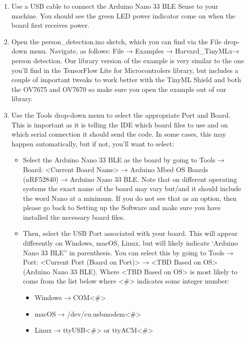 \begin{enumerate}
  \item Use a USB cable to connect the Arduino Nano 33 BLE Sense to your machine. You should see the green LED power indicator come on when the board first receives power.
  
  \item  Open the person\_detection.ino sketch, which you can find via the File drop-down menu. Navigate, as follows: File → Examples → Harvard\_TinyMLx→ person detection. Our library version of the example is very similar to the one you’ll find in the TensorFlow Lite for Microcontrolers library, but includes a couple of important tweaks to work better with the TinyML Shield and both the OV7675 and OV7670 so make sure you open the example out of our library.

  \item  Use the Tools drop-down menu to select the appropriate Port and Board. This is important as it is telling the IDE which board files to use and on which serial connection it should send the code. In some cases, this may happen automatically, but if not, you’ll want to select: 

    \begin{itemize}
      \item Select the Arduino Nano 33 BLE as the board by going to Tools → Board: <Current Board Name> → Arduino Mbed OS Boards (nRF52840) → Arduino Nano 33 BLE. Note that on different operating systems the exact name of the board may vary but/and it should include the word Nano at a minimum. If you do not see that as an option, then please go back to Setting up the Software and make sure you have installed the necessary board files.
      
      \item Then, select the USB Port associated with your board. This will appear differently on Windows, macOS, Linux, but will likely indicate ‘Arduino Nano 33 BLE” in parenthesis. You can select this by going to Tools → Port: <Current Port (Board on Port)> → <TBD Based on OS> (Arduino Nano 33 BLE). Where <TBD Based on OS> is most likely to come from the list below where <\#> indicates some integer number:
        \begin{itemize}
          \item Windows → COM<\#>
          \item macOS → /dev/cu.usbmodem<\#>
          \item Linux → ttyUSB<\#> or ttyACM<\#>
        \end{itemize}
      \end{itemize}


\end{enumerate}
